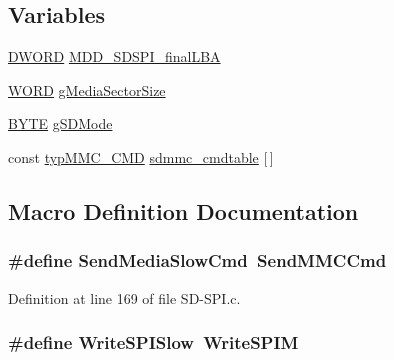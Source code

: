 \subsection*{Variables}
\begin{DoxyCompactItemize}
\item 
\hyperlink{_generic_type_defs_8h_ad342ac907eb044443153a22f964bf0af}{D\+W\+O\+R\+D} \hyperlink{_s_d-_s_p_i_8c_a6339523d4a5e4a949a160d07ee4c39c0}{M\+D\+D\+\_\+\+S\+D\+S\+P\+I\+\_\+final\+L\+B\+A}
\item 
\hyperlink{_generic_type_defs_8h_a2b0e863dadf920709ec53d9088ee7c91}{W\+O\+R\+D} \hyperlink{_s_d-_s_p_i_8c_a4e9107c4b54b4f4b6e3d3419838a6433}{g\+Media\+Sector\+Size}
\item 
\hyperlink{_generic_type_defs_8h_a4ae1dab0fb4b072a66584546209e7d58}{B\+Y\+T\+E} \hyperlink{_s_d-_s_p_i_8c_a1add6537f239a64057ced48518073f6c}{g\+S\+D\+Mode}
\item 
const \hyperlink{structtyp_m_m_c___c_m_d}{typ\+M\+M\+C\+\_\+\+C\+M\+D} \hyperlink{_s_d-_s_p_i_8c_ab6715f92255ff9a1b45df34c10c4803a}{sdmmc\+\_\+cmdtable} \mbox{[}$\,$\mbox{]}
\end{DoxyCompactItemize}


\subsection{Macro Definition Documentation}
\hypertarget{_s_d-_s_p_i_8c_a5d378e74d32d2c729f8c02e1038fcd4a}{}
\subsubsection[{Send\+Media\+Slow\+Cmd}]{\setlength{\rightskip}{0pt plus 5cm}\#define Send\+Media\+Slow\+Cmd~{\bf Send\+M\+M\+C\+Cmd}}\label{_s_d-_s_p_i_8c_a5d378e74d32d2c729f8c02e1038fcd4a}


Definition at line 169 of file S\+D-\/\+S\+P\+I.\+c.

\hypertarget{_s_d-_s_p_i_8c_ac8426536455869c8e1fac618a62fb708}{}
\subsubsection[{Write\+S\+P\+I\+Slow}]{\setlength{\rightskip}{0pt plus 5cm}\#define Write\+S\+P\+I\+Slow~{\bf Write\+S\+P\+I\+M}}\label{_s_d-_s_p_i_8c_ac8426536455869c8e1fac618a62fb708}


